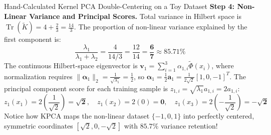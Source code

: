 \begin{examplebox}{Hand-Calculated Kernel PCA Double-Centering on a Toy Dataset}
\textbf{Step 4: Non-Linear Variance and Principal Scores.}
Total variance in Hilbert space is $\operatorname{Tr}(\tilde{K}) = 4 + \frac{2}{3} = \frac{14}{3}$.
The proportion of non-linear variance explained by the first component is:
\begin{equation}
\frac{\lambda_1}{\lambda_1 + \lambda_2} = \frac{4}{14/3} = \frac{12}{14} = \frac{\mathbf{6}}{\mathbf{7}} \approx \mathbf{85.71\%}
\end{equation}
The continuous Hilbert-space eigenvector is $\mathbf{v}_1 = \sum_{i=1}^3 \alpha_{1,i}\tilde{\Phi}(x_i)$, where normalization requires $\|\boldsymbol{\alpha}_1\|_2 = \frac{1}{\sqrt{\lambda_1}} = \frac{1}{2}$, so $\boldsymbol{\alpha}_1 = \frac{1}{2}\mathbf{a}_1 = \frac{1}{2\sqrt{2}}[1, 0, -1]^T$.
The principal component score for each training sample is $z_{1,i} = \sqrt{\lambda_1} a_{1,i} = 2 a_{1,i}$:
\begin{equation}
z_1(x_1) = 2\left(\frac{1}{\sqrt{2}}\right) = \sqrt{\mathbf{2}}, \quad z_1(x_2) = 2(0) = \mathbf{0}, \quad z_1(x_3) = 2\left(-\frac{1}{\sqrt{2}}\right) = -\sqrt{\mathbf{2}}
\end{equation}
Notice how KPCA maps the non-linear dataset $\{-1, 0, 1\}$ into perfectly centered, symmetric coordinates $[\sqrt{2}, 0, -\sqrt{2}]$ with $85.7\%$ variance retention!
\end{examplebox}

